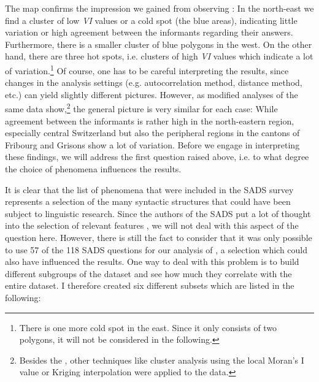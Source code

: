 \documentclass[output=paper]{LSP/langsci}
\begin{document}
\largerpage
The map confirms the impression we gained from observing : In the north-east we find a cluster of low \emph{VI} values or a cold spot (the blue areas), indicating little variation or high agreement between the informants regarding their answers. Furthermore, there is a smaller cluster of blue polygons in the west. On the other hand, there are three hot spots, i.e. clusters of high \emph{VI} values which indicate a lot of variation.\footnote{There is one more cold spot in the east. Since it only consists of two polygons, it will not be considered in the following.} Of course, one has to be careful interpreting the results, since changes in the analysis settings (e.g. autocorrelation method, distance method, etc.) can yield slightly different pictures. However, as modified analyses of the same data show,\footnote{ Besides the , other techniques like cluster analysis using the local Moran’s I value or Kriging interpolation were applied to the data.} the general picture is very similar for each case: While agreement between the informants is rather high in the north-eastern region, especially central Switzerland but also the peripheral regions in the cantons of Fribourg and Grisons show a lot of variation. Before we engage in interpreting these findings, we will address the first question raised above, i.e. to what degree the choice of phenomena influences the results.

It is clear that the list of phenomena that were included in the SADS survey represents a selection of the many syntactic structures that could have been subject to linguistic research. Since the authors of the SADS put a lot of thought into the selection of relevant features \citep{bucheli_syntactic_2002}, we will not deal with this aspect of the question here. However, there is still the fact to consider that it was only possible to use 57 of the 118 SADS questions for our analysis of , a selection which could also have influenced the results. One way to deal with this problem is to build different subgroups of the dataset and see how much they correlate with the entire dataset. I therefore created six different subsets which are listed in the following:
\end{document}
